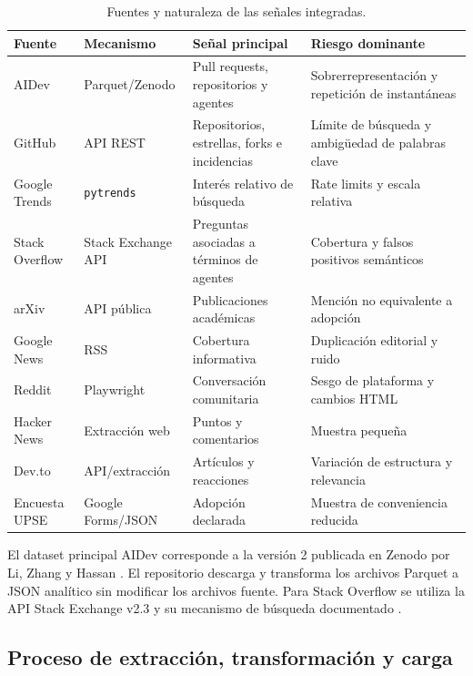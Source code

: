 \documentclass[12pt,a4paper]{article}
\newcommand{\pathcode}[1]{\begingroup\small\ttfamily\nolinkurl{#1}\endgroup}
\begin{document}
\begin{table}[H]
\centering
\small
{}
\begin{tabularx}{\textwidth}{P{2.9cm} P{2.5cm} Y Y}
\toprule
{}
\textbf{Fuente} & \textbf{Mecanismo} & \textbf{Señal principal} & \textbf{Riesgo dominante} \\
\midrule
AIDev & Parquet/Zenodo & Pull requests, repositorios y agentes & Sobrerrepresentación y repetición de instantáneas \\
GitHub & API REST & Repositorios, estrellas, forks e incidencias & Límite de búsqueda y ambigüedad de palabras clave \\
Google Trends & \pathcode{pytrends} & Interés relativo de búsqueda & Rate limits y escala relativa \\
Stack Overflow & Stack Exchange API & Preguntas asociadas a términos de agentes & Cobertura y falsos positivos semánticos \\
arXiv & API pública & Publicaciones académicas & Mención no equivalente a adopción \\
Google News & RSS & Cobertura informativa & Duplicación editorial y ruido \\
Reddit & Playwright & Conversación comunitaria & Sesgo de plataforma y cambios HTML \\
Hacker News & Extracción web & Puntos y comentarios & Muestra pequeña \\
Dev.to & API/extracción & Artículos y reacciones & Variación de estructura y relevancia \\
Encuesta UPSE & Google Forms/JSON & Adopción declarada & Muestra de conveniencia reducida \\
\bottomrule
\end{tabularx}
\caption{Fuentes y naturaleza de las señales integradas.}
\label{tab:fuentes}
\end{table}

El dataset principal AIDev corresponde a la versión 2 publicada en Zenodo por Li, Zhang y Hassan \cite{aidev_dataset}. El repositorio descarga y transforma los archivos Parquet a JSON analítico sin modificar los archivos fuente. Para Stack Overflow se utiliza la API Stack Exchange v2.3 y su mecanismo de búsqueda documentado \cite{stackexchange_api}.

\subsection{Proceso de extracción, transformación y carga}
\end{document}
